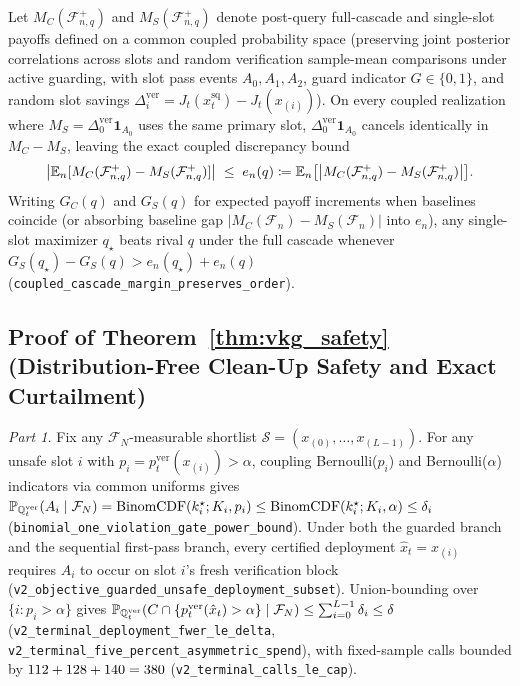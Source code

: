 \begin{proposition}\label{prop:cascade_rank}
Let $M_C(\mathcal{F}_{n,q}^+)$ and $M_S(\mathcal{F}_{n,q}^+)$ denote post-query full-cascade and single-slot payoffs defined on a common coupled probability space (preserving joint posterior correlations across slots and random verification sample-mean comparisons under active guarding, with slot pass events $A_0, A_1, A_2$, guard indicator $G \in \{0,1\}$, and random slot savings $\Delta_i^{\mathrm{ver}} = J_t(x_t^{\mathrm{sq}}) - J_t(x_{(i)})$). On every coupled realization where $M_S = \Delta_0^{\mathrm{ver}}\mathbf{1}_{A_0}$ uses the same primary slot, $\Delta_0^{\mathrm{ver}}\mathbf{1}_{A_0}$ cancels identically in $M_C - M_S$, leaving the exact coupled discrepancy bound
\[
  \big|\mathbb{E}_n[M_C(\mathcal{F}_{n,q}^+) - M_S(\mathcal{F}_{n,q}^+)]\big|
  \;\le\; e_n(q) \coloneqq \mathbb{E}_n\big[\big|M_C(\mathcal{F}_{n,q}^+) - M_S(\mathcal{F}_{n,q}^+)\big|\big].
\]
Writing $G_C(q)$ and $G_S(q)$ for expected payoff increments when baselines coincide (or absorbing baseline gap $|M_C(\mathcal{F}_n) - M_S(\mathcal{F}_n)|$ into $e_n$), any single-slot maximizer $q_\star$ beats rival $q$ under the full cascade whenever $G_S(q_\star) - G_S(q) > e_n(q_\star) + e_n(q)$ (\texttt{coupled\_cascade\_margin\_preserves\_order}).
\end{proposition}

\subsection{Proof of Theorem~\ref*{thm:vkg_safety} (Distribution-Free Clean-Up Safety and Exact Curtailment)}\label{ec:vkg_proof}

\emph{Part 1.} Fix any $\mathcal{F}_N$-measurable shortlist $\mathcal{S} = (x_{(0)}, \dots, x_{(L-1)})$. For any unsafe slot $i$ with $p_i = p_t^{\mathrm{ver}}(x_{(i)}) > \alpha$, coupling Bernoulli($p_i$) and Bernoulli($\alpha$) indicators via common uniforms gives $\mathbb{P}_{\mathbb{Q}_t^{\mathrm{ver}}}(A_i \mid \mathcal{F}_N) = \operatorname{BinomCDF}(k_i^\star; K_i, p_i) \le \operatorname{BinomCDF}(k_i^\star; K_i, \alpha) \le \delta_i$ (\texttt{binomial\_one\_violation\_gate\_power\_bound}). Under both the guarded branch and the sequential first-pass branch, every certified deployment $\hat{x}_t = x_{(i)}$ requires $A_i$ to occur on slot $i$'s fresh verification block (\texttt{v2\_objective\_guarded\_unsafe\_deployment\_subset}). Union-bounding over $\{i : p_i > \alpha\}$ gives $\mathbb{P}_{\mathbb{Q}_t^{\mathrm{ver}}}(C \cap \{p_t^{\mathrm{ver}}(\hat{x}_t) > \alpha\} \mid \mathcal{F}_N) \le \sum_{i=0}^{L-1} \delta_i \le \delta$ (\texttt{v2\_terminal\_deployment\_fwer\_le\_delta}, \texttt{v2\_terminal\_five\_percent\_asymmetric\_spend}), with fixed-sample calls bounded by $112 + 128 + 140 = 380$ (\texttt{v2\_terminal\_calls\_le\_cap}).

